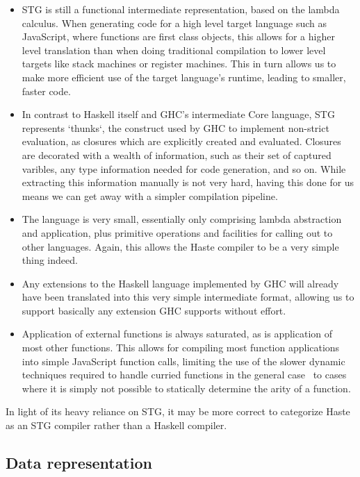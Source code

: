 \documentclass[preprint]{sigplanconf}
\begin{document}
\begin{itemize}
  \item STG is still a functional intermediate representation, based on the
        lambda calculus. When generating code for a high level target language
        such as JavaScript, where functions are first class objects, this
        allows for a higher level translation than when doing traditional
        compilation to lower level targets like stack machines or register
        machines. This in turn allows us to make more efficient use of the
        target language's runtime, leading to smaller, faster code.
  \item In contrast to Haskell itself and GHC's intermediate Core language, STG
        represents `thunks`, the construct used by GHC to implement non-strict
        evaluation, as closures which are explicitly created and evaluated.
        Closures are decorated with a wealth of information, such as their set
        of captured varibles, any type information needed for code generation,
        and so on. While extracting this information manually is not very hard,
        having this done for us means we can get away with a simpler
        compilation pipeline.
  \item The language is very small, essentially only comprising lambda
        abstraction and application, plus primitive operations and facilities
        for calling out to other languages. Again, this allows the Haste
        compiler to be a very simple thing indeed.
  \item Any extensions to the Haskell language implemented by GHC will already
        have been translated into this very simple intermediate format,
        allowing us to support basically any extension GHC supports without
        effort.
  \item Application of external functions is always saturated, as is
        application of most other functions. This allows for compiling most
        function applications into simple JavaScript function calls, limiting
        the use of the slower dynamic techniques required to handle curried
        functions in the general case\ \cite{fastcurry} to cases where it is
        simply not possible to statically determine the arity of a function.
\end{itemize}

In light of its heavy reliance on STG, it may be more correct to categorize
Haste as an STG compiler rather than a Haskell compiler.

\subsection{Data representation}
\end{document}
